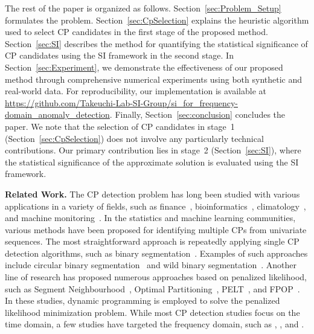The rest of the paper is organized as follows.
%
Section~\ref{sec:Problem_Setup} formulates the problem.
%
Section~\ref{sec:CpSelection} explains the heuristic algorithm used to select CP candidates in the first stage of the proposed method.
%
Section~\ref{sec:SI} describes the method for quantifying the statistical significance of CP candidates using the SI framework in the second stage.
%
In Section~\ref{sec:Experiment}, we demonstrate the effectiveness of our proposed method through comprehensive numerical experiments using both synthetic and real-world data.
For reproducibility, our implementation is available at \url{https://github.com/Takeuchi-Lab-SI-Group/si_for_frequency-domain_anomaly_detection}.
%
Finally, Section~\ref{sec:conclusion} concludes the paper.
%
We note that the selection of CP candidates in stage~1 (Section~\ref{sec:CpSelection}) does not involve any particularly technical contributions.
%
Our primary contribution lies in stage~2 (Section~\ref{sec:SI}), where the statistical significance of the approximate solution is evaluated using the SI framework.

% 

\textbf{Related Work.}
%
The CP detection problem has long been studied with various applications in a variety of fields, such as finance~\citep{fryzlewicz2014multiple, pepelyshev2017real}, bioinformatics~\citep{chen2008statistical, muggeo2011efficient, pierre2015performance}, climatology~\citep{reeves2007review, beaulieu2012change}, and machine monitoring~\citep{lu2017novel, lu2018graph}.  
%
In the statistics and machine learning communities, various methods have been proposed for identifying multiple CPs from univariate sequences.
%
The most straightforward approach is repeatedly applying single CP detection algorithms, such as binary segmentation~\citep{scott1974cluster}.
%
Examples of such approaches include circular binary segmentation~\citep{olshen2004circular} and wild binary segmentation~\citep{fryzlewicz2014wild}.  
%
Another line of research has proposed numerous approaches based on penalized likelihood, such as Segment Neighbourhood~\citep{auger1989algorithms}, Optimal Partitioning~\citep{jackson2005algorithm}, PELT~\citep{killick2012optimal}, and FPOP~\citep{maidstone2017optimal}.
%
In these studies, dynamic programming is employed to solve the penalized likelihood minimization problem.  
%
While most CP detection studies focus on the time domain, a few studies have targeted the frequency domain, such as \citet{adak1998time}, \citet{last2008detecting}, and \citet{preuss2015detection}.
%

